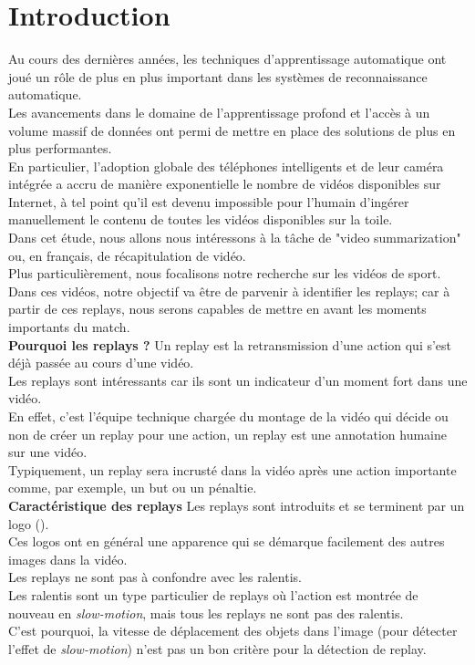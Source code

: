 \documentclass[11pt]{article}
\begin{document}
\section{Introduction}
\label{sec:org7a85dd8}
Au cours des dernières années, les techniques d'apprentissage automatique ont joué un rôle de plus en plus important dans les systèmes de reconnaissance automatique.\\
Les avancements dans le domaine de l'apprentissage profond et l'accès à un volume massif de données ont permi de mettre en place des solutions de plus en plus performantes.\\
En particulier, l'adoption globale des téléphones intelligents et de leur caméra intégrée a accru de manière exponentielle le nombre de vidéos disponibles sur Internet, à tel point qu'il est devenu impossible pour l'humain d'ingérer manuellement le contenu de toutes les vidéos disponibles sur la toile.\\
Dans cet étude, nous allons nous intéressons à la tâche de "video summarization" ou, en français, de récapitulation de vidéo.\\
Plus particulièrement, nous focalisons notre recherche sur les vidéos de sport.\\

Dans ces vidéos, notre objectif va être de parvenir à identifier les replays; car à partir de ces replays, nous serons capables de mettre en avant les moments importants du match.\\

\textbf{Pourquoi les replays ?} Un replay est la retransmission d'une action qui s'est déjà passée au cours d'une vidéo.\\
Les replays sont intéressants car ils sont un indicateur d'un moment fort dans une vidéo.\\
En effet, c'est l'équipe technique chargée du montage de la vidéo qui décide ou non de créer un replay pour une action, un replay est une annotation humaine sur une vidéo.\\
Typiquement, un replay sera incrusté dans la vidéo après une action importante comme, par exemple, un but ou un pénaltie.\\

\textbf{Caractéristique des replays} Les replays sont introduits et se terminent par un logo (\cite{Hao_Pan_2002}).\\
Ces logos ont en général une apparence qui se démarque facilement des autres images dans la vidéo.\\
Les replays ne sont pas à confondre avec les ralentis.\\
Les ralentis sont un type particulier de replays où l'action est montrée de nouveau en \emph{slow-motion}, mais tous les replays ne sont pas des ralentis.\\
C'est pourquoi, la vitesse de déplacement des objets dans l'image (pour détecter l'effet de \emph{slow-motion}) n'est pas un bon critère pour la détection de replay.\\
\end{document}
